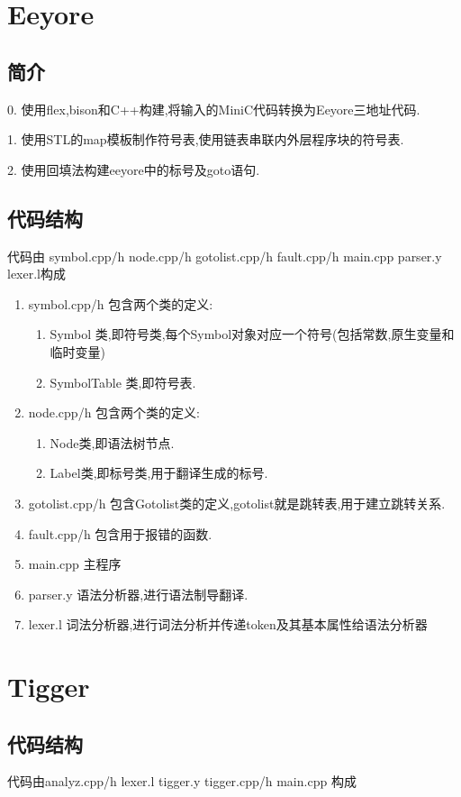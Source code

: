 \documentclass[UTF8]{article}
\begin{document}
\section{Eeyore}
\subsection{简介}
0. 使用flex,bison和C++构建,将输入的MiniC代码转换为Eeyore三地址代码.

1. 使用STL的map模板制作符号表,使用链表串联内外层程序块的符号表.

2. 使用回填法构建eeyore中的标号及goto语句.
\subsection{代码结构}
代码由 symbol.cpp/h node.cpp/h gotolist.cpp/h fault.cpp/h main.cpp parser.y lexer.l构成
\begin{enumerate}
\item symbol.cpp/h 包含两个类的定义:
\begin{enumerate}[(1)]
\item Symbol 类,即符号类,每个Symbol对象对应一个符号(包括常数,原生变量和临时变量)
\item SymbolTable 类,即符号表.
\end{enumerate}
\item node.cpp/h 包含两个类的定义:
\begin{enumerate}[(1)]
\item Node类,即语法树节点.
\item Label类,即标号类,用于翻译生成的标号.
\end{enumerate}
\item gotolist.cpp/h 包含Gotolist类的定义,gotolist就是跳转表,用于建立跳转关系.
\item fault.cpp/h 包含用于报错的函数.
\item main.cpp 主程序
\item parser.y 语法分析器,进行语法制导翻译.
\item lexer.l 词法分析器,进行词法分析并传递token及其基本属性给语法分析器
\end{enumerate}
\section{Tigger}
\subsection{代码结构}
代码由analyz.cpp/h lexer.l tigger.y tigger.cpp/h main.cpp 构成
\end{document}
